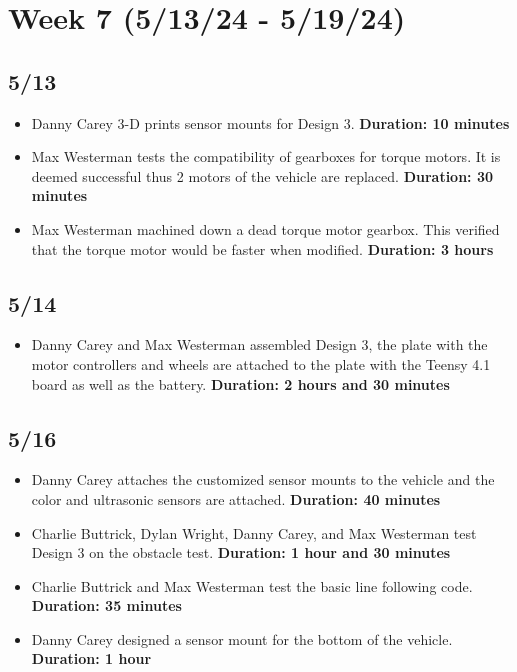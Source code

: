 \documentclass[11pt]{report}
\begin{document}
\section{Week 7 (5/13/24 - 5/19/24)}
\subsection*{5/13}

\begin{itemize}
    \item Danny Carey 3-D prints sensor mounts for Design 3. \textbf{Duration: 10 minutes}
    \item Max Westerman tests the compatibility of gearboxes for torque motors. It is deemed successful thus 2 motors of the vehicle are replaced. \textbf{Duration: 30 minutes}
    \item Max Westerman machined down a dead torque motor gearbox. This verified that the torque motor would be faster when modified. \textbf{Duration: 3 hours}
\end{itemize}

\subsection*{5/14}

\begin{itemize}
    \item Danny Carey and Max Westerman assembled Design 3, the plate with the motor controllers and wheels are attached to the plate with the Teensy 4.1 board as well as the battery. \textbf{Duration: 2 hours and 30 minutes}
\end{itemize}

\subsection*{5/16}

\begin{itemize}
    \item Danny Carey attaches the customized sensor mounts to the vehicle and the color and ultrasonic sensors are attached. \textbf{Duration: 40 minutes}
    \item Charlie Buttrick, Dylan Wright, Danny Carey, and Max Westerman test Design 3 on the obstacle test. \textbf{Duration: 1 hour and 30 minutes}
    \item Charlie Buttrick and Max Westerman test the basic line following code. \textbf{Duration: 35 minutes}
    \item Danny Carey designed a sensor mount for the bottom of the vehicle. \textbf{Duration: 1 hour}
\end{itemize}
\end{document}
